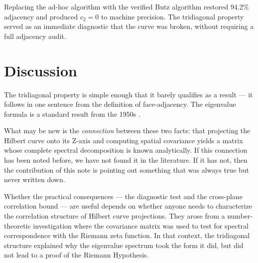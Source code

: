 \documentclass[11pt,a4paper]{article}
\begin{document}
Replacing the ad-hoc algorithm with the verified Butz algorithm
\cite{butz1971, hamilton2006} restored 94.2\% adjacency and produced
$c_2 = 0$ to machine precision. The tridiagonal property served as an
immediate diagnostic that the curve was broken, without requiring a
full adjacency audit.

\section{Discussion}

The tridiagonal property is simple enough that it barely qualifies as a
result --- it follows in one sentence from the definition of
face-adjacency. The eigenvalue formula is a standard result from the 1950s
\cite{grenander1958}.

What may be new is the \emph{connection} between these two facts: that
projecting the Hilbert curve onto its Z-axis and computing spatial
covariance yields a matrix whose complete spectral decomposition is known
analytically. If this connection has been noted before, we have not found
it in the literature. If it has not, then the contribution of this note is
pointing out something that was always true but never written down.

Whether the practical consequences --- the diagnostic test and the
cross-plane correlation bound --- are useful depends on whether anyone
needs to characterize the correlation structure of Hilbert curve
projections. They arose from a number-theoretic investigation
\cite{wesson2026} where the covariance matrix was used to test for
spectral correspondence with the Riemann zeta function. In that context,
the tridiagonal structure explained why the eigenvalue spectrum took the
form it did, but did not lead to a proof of the Riemann Hypothesis.
\end{document}
